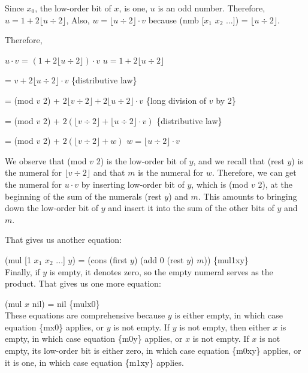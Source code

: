 Since $x_0$, the low-order bit of $x$, is one, $u$ is an odd number.
Therefore, $u = 1 + 2 \lfloor u \div 2 \rfloor$,
Also, $w = \lfloor u \div 2 \rfloor \cdot v$
because (nmb [$x_1$ $x_2$ ...]) = $\lfloor u \div 2 \rfloor$.

Therefore,

\hspace{1cm} $u \cdot v$ = $(1 + 2 \lfloor u \div 2 \rfloor) \cdot v$
\hfill $u = 1 + 2 \lfloor u \div 2 \rfloor$

\hspace{1.7cm} = $v + 2 \lfloor u \div 2 \rfloor \cdot v$
\hfill \{distributive law\}

\hspace{1.7cm} = (mod $v$ 2) + $2 \lfloor v \div 2 \rfloor + 2 \lfloor u \div 2 \rfloor \cdot v$ 
\hfill \{long division of $v$ by 2\}

\hspace{1.7cm} = (mod $v$ 2) + $2(\lfloor v \div 2 \rfloor + \lfloor u \div 2 \rfloor \cdot v)$ 
\hfill \{distributive law\}

\hspace{1.7cm} = (mod $v$ 2) + $2(\lfloor v \div 2 \rfloor + w)$
\hfill $w = \lfloor u \div 2 \rfloor \cdot v$

We observe that (mod $v$ 2) is the low-order bit of $y$,
and we recall that (rest $y$) is the numeral for $\lfloor v \div 2 \rfloor$
and that $m$ is the numeral for $w$.
Therefore, we can get the numeral for $u \cdot v$
by inserting low-order bit of $y$, which is (mod $v$ 2),
at the beginning of the sum of the numerals (rest $y$) and $m$.
This amounts to bringing down the low-order bit of $y$
and insert it into the sum of the other bits of $y$ and $m$.

That gives us another equation:

\hspace{2cm} (mul [1 $x_1$ $x_2$ ...] $y$) = (cons (first $y$) (add 0 (rest $y$) $m$)) \hfill \{mul1xy\}
\\

Finally, if $y$ is empty, it denotes zero, so the empty numeral
serves as the product. That gives us one more equation:

\hspace{2cm} (mul $x$ nil) = nil \hfill \{mulx0\}
\\

These equations are comprehensive because $y$ is either empty,
in which case equation \{mx0\} applies,
or $y$ is not empty.
If $y$ is not empty, then either $x$ is empty, in which case
equation \{m0y\} applies, or $x$ is not empty.
If $x$ is not empty, its low-order bit is either zero,
in which case equation \{m0xy\} applies, or it is one,
in which case equation \{m1xy\} applies.

